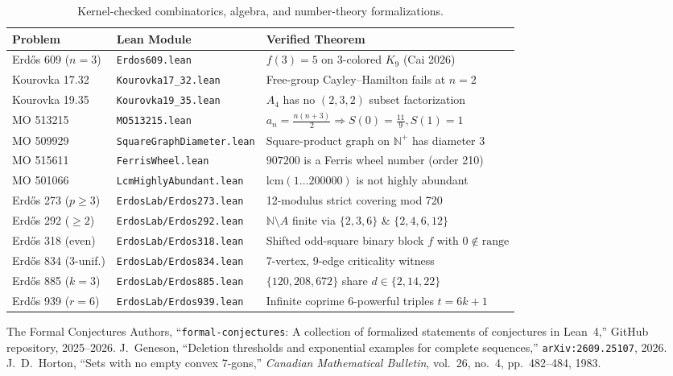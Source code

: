 \documentclass[10pt,twocolumn]{article}
\theoremstyle{definition}
\begin{document}
\begin{table}[h!]
\centering
\footnotesize
\renewcommand{\arraystretch}{1.15}
\begin{tabular}{@{}p{2.3cm}p{2.6cm}p{2.8cm}@{}}
\toprule
\textbf{Problem} & \textbf{Lean Module} & \textbf{Verified Theorem} \\
\midrule
Erd\H{o}s 609 ($n=3$) & \texttt{Erdos609.lean} & $f(3)=5$ on 3-colored $K_9$ (Cai 2026) \\
Kourovka 17.32 & \texttt{Kourovka17\_32.lean} & Free-group Cayley--Hamilton fails at $n=2$ \\
Kourovka 19.35 & \texttt{Kourovka19\_35.lean} & $A_4$ has no $(2,3,2)$ subset factorization \\
MO 513215 & \texttt{MO513215.lean} & $a_n = \frac{n(n+3)}{2} \Rightarrow S(0)=\frac{11}{9}, S(1)=1$ \\
MO 509929 & \texttt{SquareGraphDiameter.lean} & Square-product graph on $\mathbb{N}^+$ has diameter 3 \\
MO 515611 & \texttt{FerrisWheel.lean} & $907200$ is a Ferris wheel number (order 210) \\
MO 501066 & \texttt{LcmHighlyAbundant.lean} & $\mathrm{lcm}(1\dots 200000)$ is not highly abundant \\
Erd\H{o}s 273 ($p \ge 3$) & \texttt{ErdosLab/Erdos273.lean} & 12-modulus strict covering mod 720 \\
Erd\H{o}s 292 ($\ge 2$) & \texttt{ErdosLab/Erdos292.lean} & $\mathbb{N}\setminus A$ finite via $\{2,3,6\}$ \& $\{2,4,6,12\}$ \\
Erd\H{o}s 318 (even) & \texttt{ErdosLab/Erdos318.lean} & Shifted odd-square binary block $f$ with $0 \notin \text{range}$ \\
Erd\H{o}s 834 (3-unif.) & \texttt{ErdosLab/Erdos834.lean} & 7-vertex, 9-edge criticality witness \\
Erd\H{o}s 885 ($k=3$) & \texttt{ErdosLab/Erdos885.lean} & $\{120,208,672\}$ share $d \in \{2,14,22\}$ \\
Erd\H{o}s 939 ($r=6$) & \texttt{ErdosLab/Erdos939.lean} & Infinite coprime 6-powerful triples $t = 6k+1$ \\
\bottomrule
\end{tabular}
\caption{Kernel-checked combinatorics, algebra, and number-theory formalizations.}
\label{tab:roster}
\end{table}

\begin{thebibliography}{9}
\small
{}
The Formal Conjectures Authors, ``\texttt{formal-conjectures}: A collection of formalized statements of conjectures in Lean~4,'' GitHub repository, 2025--2026.
J.~Geneson, ``Deletion thresholds and exponential examples for complete sequences,'' \texttt{arXiv:2609.25107}, 2026.
J.~D.~Horton, ``Sets with no empty convex 7-gons,'' \emph{Canadian Mathematical Bulletin}, vol.~26, no.~4, pp.~482--484, 1983.
\end{thebibliography}
\end{document}
